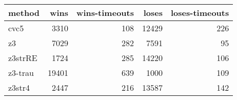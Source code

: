 \begin{tabular}{lrrrr}
\hline
 method   &   wins &   wins-timeouts &   loses &   loses-timeouts \\
\hline
 cvc5     &   3310 &             108 &   12429 &              226 \\
 z3       &   7029 &             282 &    7591 &               95 \\
 z3strRE  &   1724 &             285 &   14220 &              106 \\
 z3-trau  &  19401 &             639 &    1000 &              109 \\
 z3str4   &   2447 &             216 &   13587 &              142 \\
\hline
\end{tabular}
